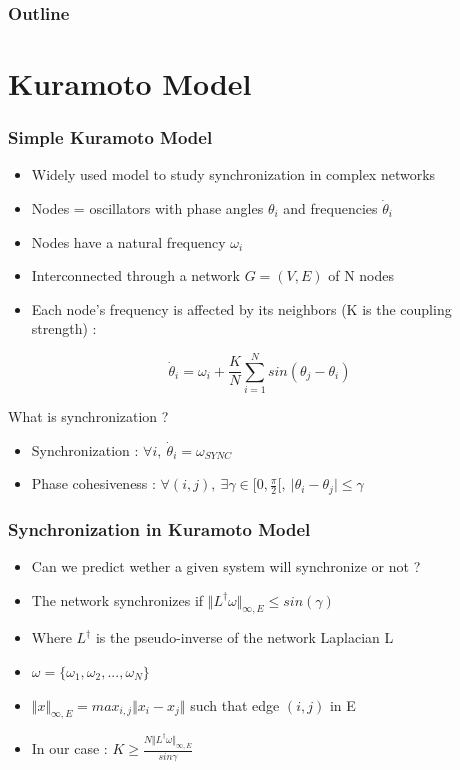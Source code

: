 \documentclass[xcolor=dvipsnames]{beamer}
\begin{document}
\begin{frame}
	\frametitle{Outline}
	\tableofcontents
\end{frame}


\section{Kuramoto Model}

\begin{frame}
	\frametitle{Simple Kuramoto Model}
	
	\begin{itemize}
		\item Widely used model to study synchronization in complex networks
		\item Nodes = oscillators with phase angles $ \theta_i $ and frequencies $ \dot{\theta}_i $
		\item Nodes have a natural frequency $\omega_i $
		\item Interconnected through a network $G=(V,E)$ of N nodes
		\item Each node's frequency is affected by its neighbors (K is the coupling strength) :
	\end{itemize}
	\begin{center}
		\[ \dot{\theta}_i = \omega_i + \frac{K}{N} \sum_{i=1}^{N} sin(\theta_j - \theta_i) \]
	\end{center}
	What is synchronization ?
	\begin{itemize}
		\item Synchronization : $ \forall i,\ \dot{\theta}_i = \omega_{SYNC} $
		\item Phase cohesiveness : $ \forall (i,j),\ \exists \gamma \in [0,\frac{\pi}{2}[,\ \vert \theta_i - \theta_j \vert \leq \gamma $
	\end{itemize}	
\end{frame}



\begin{frame}
	\frametitle{Synchronization in Kuramoto Model}
	
	\begin{itemize}
		\item Can we predict wether a given system will synchronize or not ?
		\item The network synchronizes if $ \Vert L^{\dagger} \omega \Vert_{\infty,E} \leq sin(\gamma) $ 
		\item Where $L^{\dagger}$ is the pseudo-inverse of the network Laplacian L
		\item $ \omega = \{ \omega_1, \omega_2,..., \omega_N \}$
		\item $ \Vert x \Vert_{\infty,E} = max_{i,j} \Vert x_i - x_j \Vert $ such that edge $(i,j)$ in E
		\item In our case : $ K \geq \frac{N \Vert L^{\dagger} \omega \Vert_{\infty,E}}{sin \gamma} $
	\end{itemize}
\end{frame}
\end{document}
